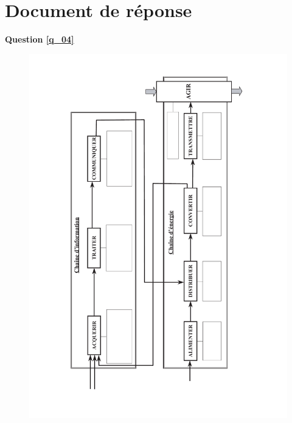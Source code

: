 \documentclass[10pt,fleqn]{article} %
\begin{document}
\ifprof
\else

\newpage 
\section*{Document de réponse}

\textbf{Question \ref{q_04}}

\begin{figure}[H]
\centering
\includegraphics[width=.8\linewidth]{dr_01.pdf}
\end{figure}
\end{document}
